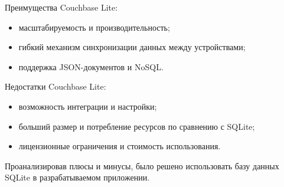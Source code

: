 Преимущества Couchbase Lite:
\begin{itemize}
        \item масштабируемость и производительность;
        \item гибкий механизм синхронизации данных между устройствами;
        \item поддержка JSON-документов и NoSQL.
    \end{itemize}

Недостатки  Couchbase Lite:
\begin{itemize}
        \item возможность интеграции и настройки;
        \item больший размер и потребление ресурсов по сравнению с SQLite;
        \item лицензионные ограничения и стоимость использования.
    \end{itemize}
    
Проанализировав плюсы и минусы, было решено использовать базу данных SQLite в разрабатываемом приложении.